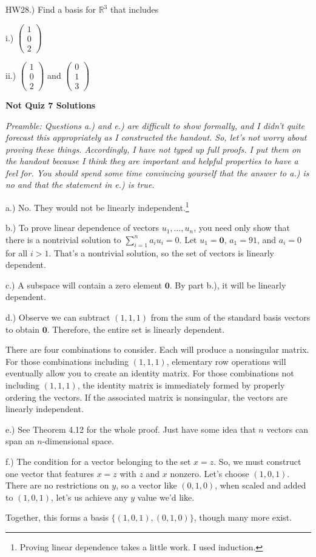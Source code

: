 \documentclass{article}
\begin{document}
\bigskip{}
HW28.) Find a basis for $\mathbb{R}^3$ that includes

i.) $\left(\begin{array}{c}
1\\
0\\
2 \end{array}\right)$

ii.) $\left(\begin{array}{c}
1\\
0\\
2 \end{array}\right)$ and $\left(\begin{array}{c}
0\\
1\\
3 \end{array}\right)$




\pagebreak

\textbf{Not Quiz 7 Solutions}

\it Preamble: Questions a.) and e.) are difficult to show formally, and I didn't quite forecast this appropriately as I constructed the handout. So, let's not worry about proving these things. Accordingly, I have not typed up full proofs. I put them on the handout because I think they are important and helpful properties to have a feel for. You should spend some time convincing yourself that the answer to a.) is no and that the statement in e.) is true. 
\rm


a.) No. They would not be linearly independent.\footnote{Proving linear dependence takes a little work. I used induction.}


b.) To prove linear dependence of vectors $u_1, \dots, u_n$, you need only show that there is a nontrivial solution to $\sum_{i=1}^n a_i u_i =0$. Let $u_1=\mathbf{0}$, $a_1=91$, and $a_i=0$ for all $i>1$. That's a nontrivial solution, so the set of vectors is linearly dependent. 


c.) A subspace will contain a zero element $\mathbf{0}$. By part b.), it will be linearly dependent. 

d.) Observe we can subtract $(1,1,1)$ from the sum of the standard basis vectors to obtain $\mathbf{0}$. Therefore, the entire set is linearly dependent. 

There are four combinations to consider. Each will produce a nonsingular matrix. For those combinations including $(1,1,1)$, elementary row operations will eventually allow you to create an identity matrix. For those combinations not including $(1,1,1)$, the identity matrix is immediately formed by properly ordering the vectors. If the associated matrix is nonsingular, the vectors are linearly independent.


e.) See Theorem 4.12 for the whole proof. Just have some idea that $n$ vectors can span an $n$-dimensional space.


f.) The condition for a vector belonging to the set $x=z$. So, we must construct one vector that features $x=z$ with $z$ and $x$ nonzero. Let's choose $(1,0,1)$. There are no restrictions on $y$, so a vector like $(0,1,0)$, when scaled and added to $(1,0,1)$, let's us achieve any $y$ value we'd like. 

Together, this forms a basis $\{(1,0,1), (0,1,0)\}$, though many more exist.
\end{document}
